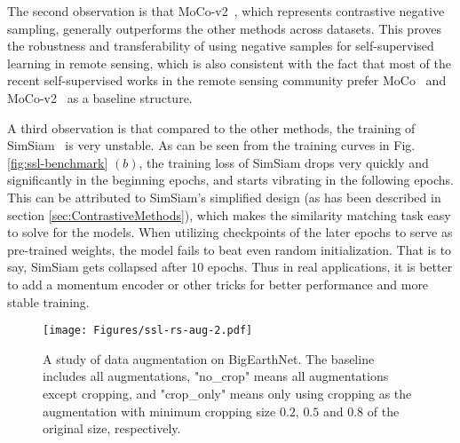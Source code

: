 \documentclass[lettersize,journal]{IEEEtran}
\begin{document}
The second observation is that MoCo-v2~\cite{chen2020improved}, which represents contrastive negative sampling, generally outperforms the other methods across datasets. This proves the robustness and transferability of using negative samples for self-supervised learning in remote sensing, which is also consistent with the fact that most of the recent self-supervised works in the remote sensing community prefer MoCo~\cite{he2020momentum} and MoCo-v2~\cite{chen2020improved} as a baseline structure.

\color{blue}
A third observation is that compared to the other methods, the training of SimSiam~\cite{chen2021exploring} is very unstable. As can be seen from the training curves in Fig. \ref{fig:ssl-benchmark} $(b)$, the training loss of SimSiam drops very quickly and significantly in the beginning epochs, and starts vibrating in the following epochs. This can be attributed to SimSiam's simplified design (as has been described in section \ref{sec:ContrastiveMethods}), which makes the similarity matching task easy to solve for the models. When utilizing checkpoints of the later epochs to serve as pre-trained weights, the model fails to beat even random initialization. That is to say, SimSiam gets collapsed after 10 epochs. Thus in real applications, it is better to add a momentum encoder or other tricks for better performance and more stable training.
\color{black}

\begin{figure}[]
    \centering
    
    \texttt{[image: Figures/ssl-rs-aug-2.pdf]}
\caption{
    A study of data augmentation on BigEarthNet. The baseline includes all augmentations, "no\_crop" means all augmentations except cropping, and "crop\_only" means only using cropping as the augmentation with minimum cropping size $0.2$, $0.5$ and $0.8$ of the original size, respectively. 
    }
    \label{fig:rs-dataaug}
\end{figure}
\end{document}
